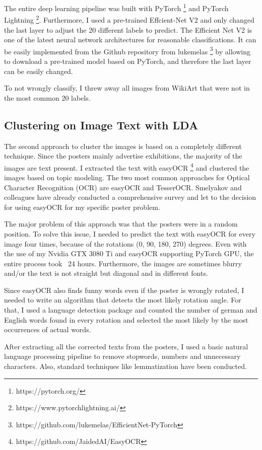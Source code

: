 \documentclass[conference]{IEEEtran}
\begin{document}
The entire deep learning pipeline was built with PyTorch \footnote{https://pytorch.org/} and PyTorch Lightning \footnote{https://www.pytorchlightning.ai/}. Furthermore, I used a pre-trained Effcient-Net V2 and only changed the last layer to adjust the 20 different labels to predict. The Efficient Net V2 \cite{Tan.} is one of the latest neural network architectures for reasonable classifications. It can be easily implemented from the Github repository from lukemelas \footnote{https://github.com/lukemelas/EfficientNet-PyTorch} by allowing to download a pre-trained model based on PyTorch, and therefore the last layer can be easily changed.

To not wrongly classify, I threw away all images from WikiArt that were not in the most common 20 labels. 

\subsection{Clustering on Image Text with LDA}

The second approach to cluster the images is based on a completely different technique. Since the posters mainly advertise exhibitions, the majority of the images are text present. I extracted the text with easyOCR \footnote{https://github.com/JaidedAI/EasyOCR} and clustered the images based on topic modeling. The two most common approaches for Optical Character Recognition (OCR) are easyOCR and TesserOCR. Smelyakov and colleagues have already conducted a comprehensive survey \cite{K.Smelyakov.2021} and let to the decision for using easyOCR for my specific poster problem. 

The major problem of this approach was that the posters were in a random position. To solve this issue, I needed to predict the text with easyOCR for every image four times, because of the rotations (0, 90, 180, 270) degrees. Even with the use of my Nvidia GTX 3080 Ti and easyOCR supporting PyTorch GPU, the entire process took ~24 hours. Furthermore, the images are sometimes blurry and/or the text is not straight but diagonal and in different fonts.

Since easyOCR also finds funny words even if the poster is wrongly rotated, I needed to write an algorithm that detects the most likely rotation angle. For that, I used a language detection package and counted the number of german and English words found in every rotation and selected the most likely by the most occurrences of actual words.

After extracting all the corrected texts from the posters, I used a basic natural language processing pipeline to remove stopwords, numbers and unnecessary characters. Also, standard techniques like lemmatization have been conducted. 
\end{document}
